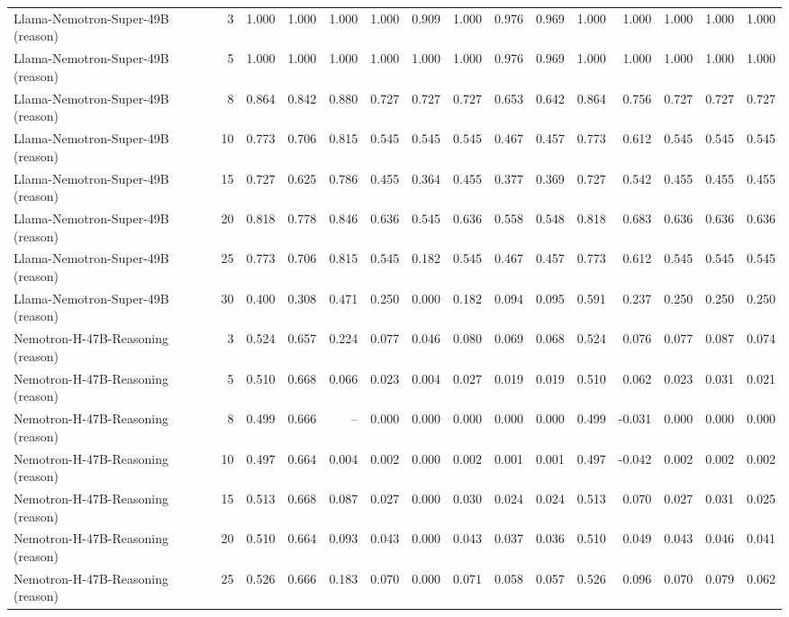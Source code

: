 \documentclass[acmsmall,screen,review,anonymous]{acmart}
\begin{document}
\begin{landscape}
\begin{longtable}{p{4.1cm}r*{13}{r}}
Llama-Nemotron-Super-49B (reason) & 3 & 1.000 & 1.000 & 1.000 & 1.000 & 0.909 & 1.000 & 0.976 & 0.969 & 1.000 & 1.000 & 1.000 & 1.000 & 1.000 \\
Llama-Nemotron-Super-49B (reason) & 5 & 1.000 & 1.000 & 1.000 & 1.000 & 1.000 & 1.000 & 0.976 & 0.969 & 1.000 & 1.000 & 1.000 & 1.000 & 1.000 \\
Llama-Nemotron-Super-49B (reason) & 8 & 0.864 & 0.842 & 0.880 & 0.727 & 0.727 & 0.727 & 0.653 & 0.642 & 0.864 & 0.756 & 0.727 & 0.727 & 0.727 \\
Llama-Nemotron-Super-49B (reason) & 10 & 0.773 & 0.706 & 0.815 & 0.545 & 0.545 & 0.545 & 0.467 & 0.457 & 0.773 & 0.612 & 0.545 & 0.545 & 0.545 \\
Llama-Nemotron-Super-49B (reason) & 15 & 0.727 & 0.625 & 0.786 & 0.455 & 0.364 & 0.455 & 0.377 & 0.369 & 0.727 & 0.542 & 0.455 & 0.455 & 0.455 \\
Llama-Nemotron-Super-49B (reason) & 20 & 0.818 & 0.778 & 0.846 & 0.636 & 0.545 & 0.636 & 0.558 & 0.548 & 0.818 & 0.683 & 0.636 & 0.636 & 0.636 \\
Llama-Nemotron-Super-49B (reason) & 25 & 0.773 & 0.706 & 0.815 & 0.545 & 0.182 & 0.545 & 0.467 & 0.457 & 0.773 & 0.612 & 0.545 & 0.545 & 0.545 \\
Llama-Nemotron-Super-49B (reason) & 30 & 0.400 & 0.308 & 0.471 & 0.250 & 0.000 & 0.182 & 0.094 & 0.095 & 0.591 & 0.237 & 0.250 & 0.250 & 0.250 \\
Nemotron-H-47B-Reasoning (reason) & 3 & 0.524 & 0.657 & 0.224 & 0.077 & 0.046 & 0.080 & 0.069 & 0.068 & 0.524 & 0.076 & 0.077 & 0.087 & 0.074 \\
Nemotron-H-47B-Reasoning (reason) & 5 & 0.510 & 0.668 & 0.066 & 0.023 & 0.004 & 0.027 & 0.019 & 0.019 & 0.510 & 0.062 & 0.023 & 0.031 & 0.021 \\
Nemotron-H-47B-Reasoning (reason) & 8 & 0.499 & 0.666 & -- & 0.000 & 0.000 & 0.000 & 0.000 & 0.000 & 0.499 & -0.031 & 0.000 & 0.000 & 0.000 \\
Nemotron-H-47B-Reasoning (reason) & 10 & 0.497 & 0.664 & 0.004 & 0.002 & 0.000 & 0.002 & 0.001 & 0.001 & 0.497 & -0.042 & 0.002 & 0.002 & 0.002 \\
Nemotron-H-47B-Reasoning (reason) & 15 & 0.513 & 0.668 & 0.087 & 0.027 & 0.000 & 0.030 & 0.024 & 0.024 & 0.513 & 0.070 & 0.027 & 0.031 & 0.025 \\
Nemotron-H-47B-Reasoning (reason) & 20 & 0.510 & 0.664 & 0.093 & 0.043 & 0.000 & 0.043 & 0.037 & 0.036 & 0.510 & 0.049 & 0.043 & 0.046 & 0.041 \\
Nemotron-H-47B-Reasoning (reason) & 25 & 0.526 & 0.666 & 0.183 & 0.070 & 0.000 & 0.071 & 0.058 & 0.057 & 0.526 & 0.096 & 0.070 & 0.079 & 0.062 \\

\end{longtable}
\end{landscape}
\end{document}
